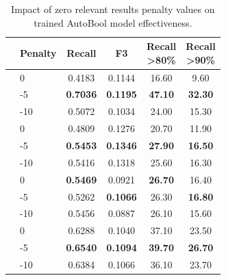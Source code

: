 \begin{table}[t]
	\small
	\centering
	\caption{Impact of zero relevant results penalty values on trained AutoBool model effectiveness.}
	\label{tab:eval-results-off-topic-penalty}

	\begin{tabular}{llcccc}\toprule
		& Penalty & Recall & F3 & \parbox{2.5em}{Recall\\>80\%}  & \parbox{2.5em}{Recall\\>90\%} \\
		\midrule
		 & 0 & 0.4183 & 0.1144 & 16.60 & 9.60 \\
		& -5 & \textbf{0.7036} & \textbf{0.1195} & \textbf{47.10} & \textbf{32.30} \\
		& -10 & 0.5072 & 0.1034 & 24.00 & 15.30 \\
		\midrule
		 & 0 & 0.4809 & 0.1276 & 20.70 & 11.90 \\
		& -5 & \textbf{0.5453} & \textbf{0.1346} & \textbf{27.90} & \textbf{16.50} \\
		& -10 & 0.5416 & 0.1318 & 25.60 & 16.30 \\
		\midrule
		 & 0 & \textbf{0.5469} & 0.0921 & \textbf{26.70} & 16.40 \\
		& -5 & 0.5262 & \textbf{0.1066} & 26.30 & \textbf{16.80} \\
		& -10 & 0.5456 & 0.0887 & 26.10 & 15.60 \\
		\midrule
		 & 0 & 0.6288 & 0.1040 & 37.10 & 23.50 \\
		& -5 & \textbf{0.6540} & \textbf{0.1094} & \textbf{39.70} & \textbf{26.70} \\
		& -10 & 0.6384 & 0.1066 & 36.10 & 23.70 \\
		
		\bottomrule
	\end{tabular}

\end{table}







